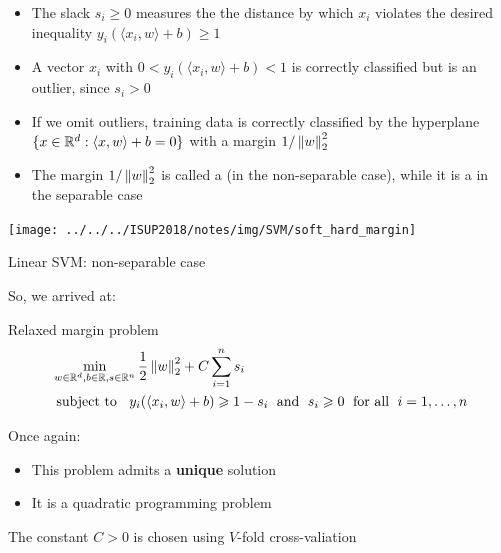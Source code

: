 \documentclass[xcolor={usenames,dvipsnames}]{beamer}
\begin{document}
\begin{frame}{}
  \begin{itemize}
    \item The slack $s_i \geq 0$ measures the the distance by which $x_i$ violates the desired inequality $y_i (\langle {x_i, w} \rangle  + b) \geq 1$ 
   \pause
    \item A vector $x_i$ with $0 < y_i (\langle {x_i, w} \rangle  + b) < 1$ is correctly classified but is an outlier, since $s_i > 0$
    \pause
    \item If we omit outliers, training data is correctly classified by the hyperplane $\{ x \in \mathbb{R}^d : \langle {x, w} \rangle  + b = 0 \}$ with a margin $1 / \left\| w \right\|_2^2$
    \pause
    \item The margin $1 / \left\| w \right\|_2^2$ is called a \textbf{} (in the non-separable case), while it is a \textbf{} in the separable case
  \end{itemize}

  \begin{center}
    \texttt{[image: ../../../ISUP2018/notes/img/SVM/soft\_hard\_margin]}  
  \end{center}
 \end{frame}   




\begin{frame}{Linear SVM: non-separable case}

So, we arrived at:
\begin{block}{Relaxed margin problem}
\begin{align*}
  &\min_{w \in \mathbb{R}^d, b \in \mathbb{R}, s \in \mathbb{R}^n} \frac 12 \left\| w \right\|_2^2 
  + C \sum_{i=1}^n s_i \\
  &\text{ subject to } \;\;  y_i (\langle {x_i, w} \rangle + b) \geqslant 1 - s_i \; 
  \text{ and } \; s_i \geqslant 0 \; \text{ for all }  \;i=1, \ldots, n
\end{align*}
\end{block}

Once again:
\begin{itemize}
  \item This problem admits a \textbf{unique} solution
  \item It is a quadratic programming problem
\end{itemize}

\medskip
The constant $C > 0$ is chosen using $V$-fold cross-valiation
\end{frame}
\end{document}
